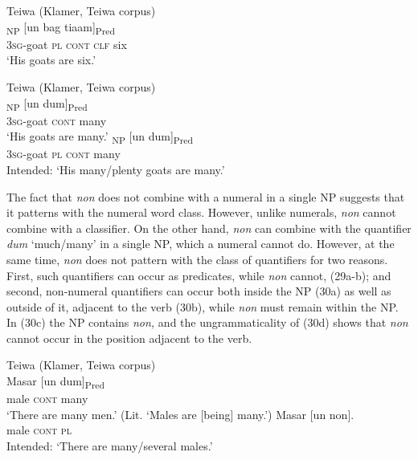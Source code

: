 \ea%
\label{ex:27}
Teiwa (Klamer, Teiwa corpus)\\
\textsubscript{NP} [{un} bag {tiaam}]\textsubscript{Pred} \\
    \textsc{3sg}-goat \textsc{pl cont clf} six \\
\glt `His goats are six.'
\z







\ea%
\label{ex:28}
Teiwa (Klamer, Teiwa corpus)\\
\ea
\gll [{Ga-qavif}] \textsubscript{NP} [un dum]\textsubscript{Pred}  \\
 \textsc{3sg}-goat \textsc{cont} many   \\
\glt `His goats are many.'
\ex
{}\textsubscript{NP} [un dum]\textsubscript{Pred}  \\
    \textsc{3sg}-goat \textsc{pl} \textsc{cont} many\\
\glt Intended: `His many/plenty goats are many.'
\z
\z






The fact that \textit{non} does not combine with a numeral in a single NP suggests that it patterns with the numeral word class. However, unlike numerals, \textit{non} cannot combine with a classifier. On the other hand, \textit{non} can combine with the quantifier \textit{dum} `much/many' in a single NP, which a numeral cannot do. However, at the same time, \textit{non} does not pattern with the class of quantifiers for two reasons. First, such quantifiers can occur as predicates, while \textit{non} cannot, (29a-b); and second, non-numeral quantifiers can occur both inside the NP (30a) as well as outside of it, adjacent to the verb (30b), while \textit{non} must remain within the NP. In (30c) the NP contains \textit{non,} and the ungrammaticality of (30d) shows that \textit{non} cannot occur in the position adjacent to the verb.


\ea%
\label{ex:29}
Teiwa (Klamer, Teiwa corpus)\\
\ea
\gll Masar [un dum]\textsubscript{Pred} \\
    male \textsc{cont} many \\
\glt  `There are many men.' (Lit. `Males are [being] many.')
\ex
\gll *Masar [un non]{.} \\
   male \textsc{cont} \textsc{pl}  \\
\glt  Intended: `There are many/several males.'
\z
\z







